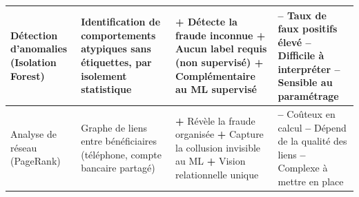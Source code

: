 \documentclass[a4paper, oneside, 12pt]{book}
\begin{document}
\begin{table}[H]
\begin{tabular}{|>{\bfseries\raggedright\arraybackslash}p{2.8cm}|p{3.8cm}|p{4.5cm}|p{4.5cm}|}
Détection d'anomalies (Isolation Forest) 
& Identification de comportements atypiques sans étiquettes, par isolement statistique
& \cellcolor{GreenBG}
  \textcolor{GreenTxt}{\textbf{+}} Détecte la fraude inconnue \newline
  \textcolor{GreenTxt}{\textbf{+}} Aucun label requis (non supervisé) \newline
  \textcolor{GreenTxt}{\textbf{+}} Complémentaire au ML supervisé
& 
  \textcolor{RedTxt}{\textbf{--}} Taux de faux positifs élevé \newline
  \textcolor{RedTxt}{\textbf{--}} Difficile à interpréter \newline
  \textcolor{RedTxt}{\textbf{--}} Sensible au paramétrage \\
\hline
 
Analyse de réseau (PageRank) 
& Graphe de liens entre bénéficiaires (téléphone, compte bancaire partagé)
& \cellcolor{GreenBG}
  \textcolor{GreenTxt}{\textbf{+}} Révèle la fraude organisée \newline
  \textcolor{GreenTxt}{\textbf{+}} Capture la collusion invisible au ML \newline
  \textcolor{GreenTxt}{\textbf{+}} Vision relationnelle unique
& 
  \textcolor{RedTxt}{\textbf{--}} Coûteux en calcul \newline
  \textcolor{RedTxt}{\textbf{--}} Dépend de la qualité des liens \newline
  \textcolor{RedTxt}{\textbf{--}} Complexe à mettre en place \\
\hline
 
 
\end{tabular}

\end{table}
 
\end{document}
